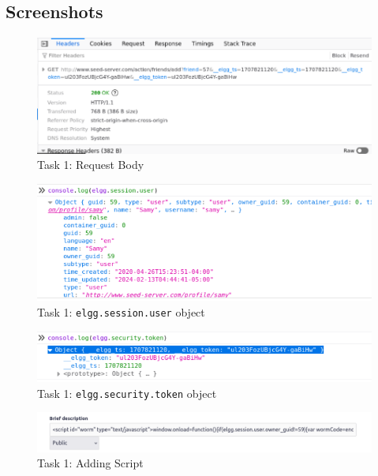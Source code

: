 \documentclass[a4paper, 11pt, oneside]{article} %
\begin{document}
\subsection{Screenshots}
\begin{figure}[H]
    \includegraphics[width = 0.95\linewidth, center]{img/task1/1a.png}
    \caption{Task 1: Request Body}
    \label{fig:task1a}
\end{figure}
\begin{figure}[H]
    \includegraphics[width = 0.95\linewidth, center]{img/task1/1b.png}
    \caption{Task 1: \texttt{elgg.session.user} object}
    \label{fig:task1b}
\end{figure}
\begin{figure}[H]
    \includegraphics[width = 0.95\linewidth, center]{img/task1/1c.png}
    \caption{Task 1: \texttt{elgg.security.token} object}
    \label{fig:task1c}
\end{figure}
\begin{figure}[H]
    \includegraphics[width = 0.95\linewidth, center]{img/task1/1d.png}
    \caption{Task 1: Adding Script}
    \label{fig:task1d}
\end{figure}
\end{document}
